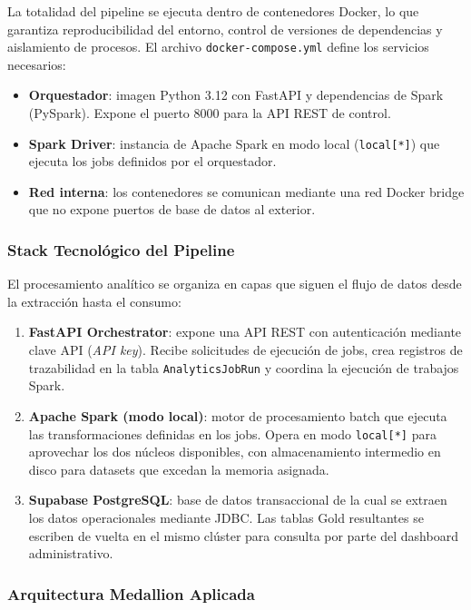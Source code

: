 La totalidad del pipeline se ejecuta dentro de contenedores Docker, lo que
garantiza reproducibilidad del entorno, control de versiones de dependencias y
aislamiento de procesos. El archivo \texttt{docker-compose.yml} define los
servicios necesarios:

\begin{itemize}[leftmargin=1.5em]
  \item \textbf{Orquestador}: imagen Python 3.12 con FastAPI y dependencias
  de Spark (PySpark). Expone el puerto 8000 para la API REST de control.
  \item \textbf{Spark Driver}: instancia de Apache Spark en modo local
  (\texttt{local[*]}) que ejecuta los jobs definidos por el orquestador.
  \item \textbf{Red interna}: los contenedores se comunican mediante una red
  Docker bridge que no expone puertos de base de datos al exterior.
\end{itemize}

\subsubsection{Stack Tecnológico del Pipeline}

El procesamiento analítico se organiza en capas que siguen el flujo de datos
desde la extracción hasta el consumo:

\begin{enumerate}[leftmargin=1.5em]
  \item \textbf{FastAPI Orchestrator}: expone una API REST con autenticación
  mediante clave API (\textit{API key}). Recibe solicitudes de ejecución de
  jobs, crea registros de trazabilidad en la tabla
  \texttt{AnalyticsJobRun} y coordina la ejecución de trabajos Spark.
  \item \textbf{Apache Spark (modo local)}: motor de procesamiento batch
  que ejecuta las transformaciones definidas en los jobs. Opera en modo
  \texttt{local[*]} para aprovechar los dos núcleos disponibles, con
  almacenamiento intermedio en disco para datasets que excedan la memoria
  asignada.
  \item \textbf{Supabase PostgreSQL}: base de datos transaccional de la cual
  se extraen los datos operacionales mediante JDBC. Las tablas Gold
  resultantes se escriben de vuelta en el mismo clúster para consulta por
  parte del dashboard administrativo.
\end{enumerate}

\subsubsection{Arquitectura Medallion Aplicada}

